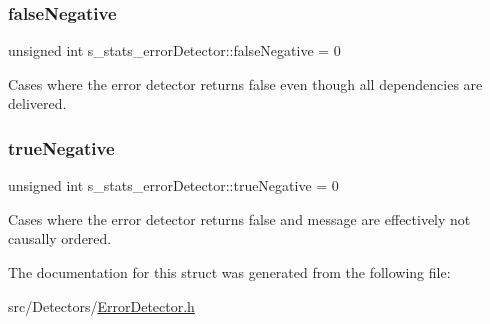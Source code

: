 \subsubsection{\texorpdfstring{false\+Negative}{falseNegative}}
{\footnotesize\ttfamily unsigned int s\+\_\+stats\+\_\+error\+Detector\+::false\+Negative = 0}



Cases where the error detector returns false even though all dependencies are delivered. 

\mbox{\label{structs__stats__error_detector_ad37aeef79761af921bb44f31024c78ce}} 
\subsubsection{\texorpdfstring{true\+Negative}{trueNegative}}
{\footnotesize\ttfamily unsigned int s\+\_\+stats\+\_\+error\+Detector\+::true\+Negative = 0}



Cases where the error detector returns false and message are effectively not causally ordered. 



The documentation for this struct was generated from the following file\+:\begin{DoxyCompactItemize}
\item 
src/\+Detectors/\hyperlink{_error_detector_8h}{Error\+Detector.\+h}\end{DoxyCompactItemize}
